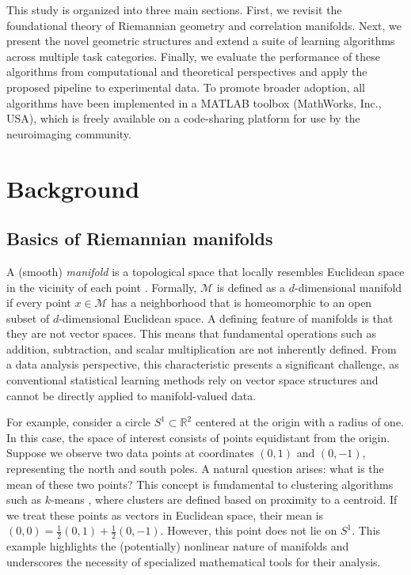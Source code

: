 \documentclass[10pt]{article}
\newcommand{\calM}{\mathcal{M}}
\begin{document}
This study is organized into three main sections. First, we revisit the foundational theory of Riemannian geometry and correlation manifolds. Next, we present the novel geometric structures and extend a suite of learning algorithms across multiple task categories. Finally, we evaluate the performance of these algorithms from computational and theoretical perspectives and apply the proposed pipeline to experimental data. To promote broader adoption, all algorithms have been implemented in a MATLAB toolbox (MathWorks, Inc., USA), which is freely available on a code-sharing platform for use by the neuroimaging community.





\section{Background}\label{sec:background}

\subsection{Basics of Riemannian manifolds}

A (smooth) \textit{manifold} is a topological space that locally resembles Euclidean space in the vicinity of each point \citep{lee_2012_IntroductionSmoothManifolds}. Formally, $\calM$ is defined as a $d$-dimensional manifold if every point $x \in \calM$ has a neighborhood that is homeomorphic to an open subset of $d$-dimensional Euclidean space. A defining feature of manifolds is that they are not vector spaces. This means that fundamental operations such as addition, subtraction, and scalar multiplication are not inherently defined. From a data analysis perspective, this characteristic presents a significant challenge, as conventional statistical learning methods rely on vector space structures and cannot be directly applied to manifold-valued data.



For example, consider a circle $S^1 \subset \mathbb{R}^2$ centered at the origin with a radius of one. In this case, the space of interest consists of points equidistant from the origin. Suppose we observe two data points at coordinates $(0,1)$ and $(0,-1)$, representing the north and south poles. A natural question arises: what is the mean of these two points? This concept is fundamental to clustering algorithms such as $k$-means \citep{macqueen_1967_MethodsClassificationAnalysis}, where clusters are defined based on proximity to a centroid. If we treat these points as vectors in Euclidean space, their mean is $(0,0) = \frac{1}{2}(0,1) + \frac{1}{2}(0,-1)$. However, this point does not lie on $S^1$. This example highlights the (potentially) nonlinear nature of manifolds and underscores the necessity of specialized mathematical tools for their analysis.
\end{document}
